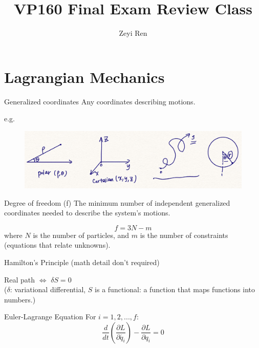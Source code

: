 \documentclass{beamer}
\title{VP160 Final Exam Review Class}
\author{Zeyi Ren}
\institute{UM-SJTU Joint Institute}
\begin{document}
\maketitle

\frame{\tableofcontents}

\section{Lagrangian Mechanics}
\begin{frame}
  \begin{block}{Generalized coordinates}
    Any coordinates describing motions.
  \end{block}
  e.g.
  \begin{figure}[H]
  \centering
  \includegraphics[width= 0.6\linewidth, angle =0]{example1.png}
  \label{fig:1}
  \end{figure}
  \begin{block}{Degree of freedom (f)}
    The minimum number of independent generalized coordinates needed to describe the system's motions.
  \end{block}
  $$
  f = 3N - m
  $$
  where $N$ is the number of particles, and $m$ is the number of constraints (equations that relate unknowns).
\end{frame}

\begin{frame}
  \begin{block}{Hamilton's Principle (math detail don't required)}
    \begin{center}
    Real path $\Longleftrightarrow$ $\delta S = 0$\\ ($\delta$: variational differential, $S$ is a functional: a function that maps functions into numbers.)
    \end{center}
  \end{block}
  \begin{block}{Euler-Lagrange Equation}
    For $i = 1, 2,...,f$:
    $$
    \frac{d}{dt}(\frac{\partial L}{\partial \dot{q_i}})-\frac{\partial L}{\partial q_i} = 0
    $$
  \end{block}
\end{frame}
\end{document}
